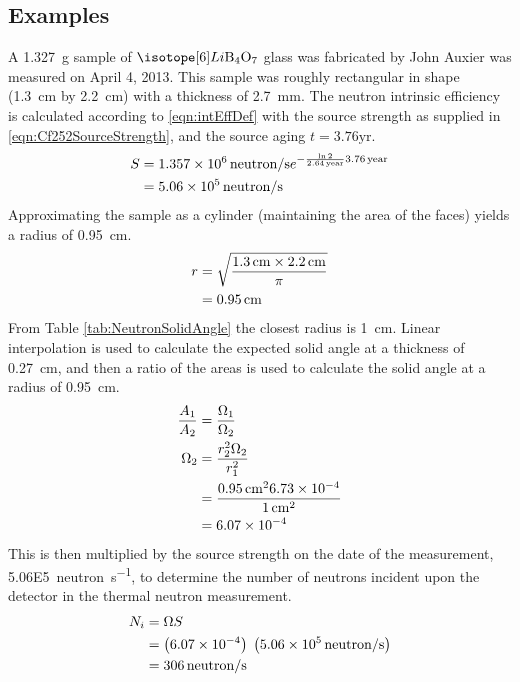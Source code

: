 \documentclass[draftcls,onecolumn]{IEEEtran}
\begin{document}
\subsection{Examples}
\begin{Exercise*}[label={LiBorateGlass},title={Li borate glass},name={Example}]
A \SI{1.327}{\g} sample of $\iso[6]{Li}\text{B}_4\text{O}_7$ glass was fabricated by John Auxier was measured on April 4, 2013.
This sample was roughly rectangular in shape (\SI{1.3}{\cm} by \SI{2.2}{\cm}) with a thickness of \SI{2.7}{\mm}.
The neutron intrinsic efficiency is calculated according to \eqref{eqn:intEffDef} with the source strength as supplied in \eqref{eqn:Cf252SourceStrength}, and the source aging $t = 3.76 \text{yr}$.
\begin{align}
    S &= \SI{1.357E6}{neutron\per\second} e^{-\frac{ \ln{2}}{\SI{2.64}{year}}\SI{3.76}{year}} \\ \notag
      &= \SI{5.06E5}{neutron\per\second}
\end{align}
Approximating the sample as a cylinder (maintaining the area of the faces) yields a radius of \SI{0.95}{\cm}.
\begin{align}
	r &= \sqrt{\frac{\SI{1.3}{\cm} \times \SI{2.2}{\cm}}{\pi}} \\ \notag
	& = \SI{0.95}{\cm}
\end{align}
From Table \ref{tab:NeutronSolidAngle} the closest radius is \SI{1}{\cm}.
Linear interpolation is used to calculate the expected solid angle at a thickness of \SI{0.27}{\cm}, and then a ratio of the areas is used to calculate the solid angle at a radius of \SI{0.95}{\cm}.
\begin{align*}
	\frac{A_1}{A_2} &= \frac{\Omega_1}{\Omega_2} \\ 
	\Omega_2 &= \frac{r_2^2 \Omega_2}{r_1^2} \\
	 &= \frac{\SI{0.95}{\cm}^2 \num{6.73E-4}}{\SI{1}{\cm}^2}\\
	 &= \num{6.07E-4}
\end{align*}
This is then multiplied by the source strength on the date of the measurement, \SI{5.06E5}{neutron\per\second}, to determine the number of neutrons incident upon the detector in the thermal neutron measurement.
\begin{align*}
 	N_i &= \Omega S \\
	 &= \left (\num{6.07E-4}\right) \;\left( \SI{5.06E5}{neutron\per\second}\right) \\
   &= \SI{306}{neutron\per\second}
\end{align*}


\end{Exercise*}
\end{document}
